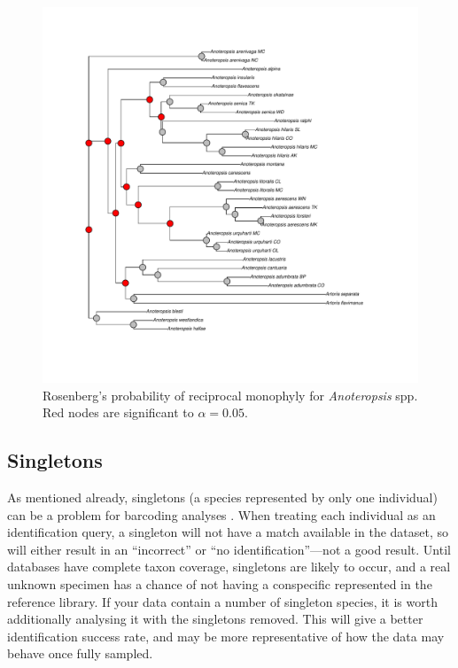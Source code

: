 \documentclass{article}
\begin{document}
\begin{figure}[p]
	\centering
	\includegraphics[width=1\textwidth, trim=3cm 3cm 3cm 3cm]{rosenbergs}
	\caption{Rosenberg's probability of reciprocal monophyly for  \emph{Anoteropsis} spp. Red nodes are significant to $\alpha = 0.05$.}
	\label{rosenbergs.fig}
\end{figure}

\subsection{Singletons}

As mentioned already, singletons (a species represented by only one individual) can be a problem for barcoding analyses \citep{Lim2011}. When treating each individual as an identification query, a singleton will not have a match available in the dataset, so will either result in an ``incorrect'' or ``no identification''---not a good result. Until databases have complete taxon coverage, singletons are likely to occur, and a real unknown specimen has a chance of not having a conspecific represented in the reference library. If your data contain a number of singleton species, it is worth additionally analysing it with the singletons removed. This will give a better identification success rate, and may be more representative of how the data may behave once fully sampled.
\end{document}
